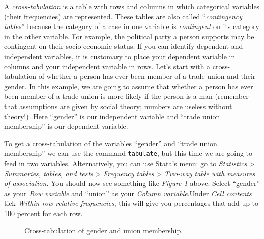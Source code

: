 \documentclass{article}
\begin{document}
A \textit{cross-tabulation} is a table with rows and columns in which categorical variables (their frequencies) are represented. These tables are also called ``\textit{contingency tables}'' because the category of a case in one variable is \textit{contingent} on its category in the other variable. For example, the political party a person supports may be contingent on their socio-economic status. If you can identify dependent and independent variables, it is customary to place your dependent variable in columns and your independent variable in rows. Let’s start with a cross-tabulation of whether a person has ever been member of a trade union and their gender. In this example, we are going to assume that whether a person has ever been member of a trade union is more likely if the person is a man (remember that assumptions are given by social theory; numbers are useless without theory!). Here ``gender'' is our independent variable and ``trade union membership'' is our dependent variable.

To get a cross-tabulation of the variables ``gender'' and ``trade union membership'' we can use the command \texttt{tabulate}, but this time we are going to feed in two variables. Alternatively, you can use Stata's menu: go to \textit{Statistics} > \textit{Summaries, tables, and tests} > \textit{Frequency tables} > \textit{Two-way table with measures of association}. You should now see something like \textit{Figure 1} above. Select ``gender'' as your \textit{Row variable} and ``union'' as your \textit{Column variable}.Under \textit{Cell contents} tick \textit{Within-row relative frequencies}, this will give you percentages that add up to 100 percent for each row.

\begin{figure}[H]
	\centering
	\caption{Cross-tabulation of gender and union membership.}
\end{figure}
\end{document}
